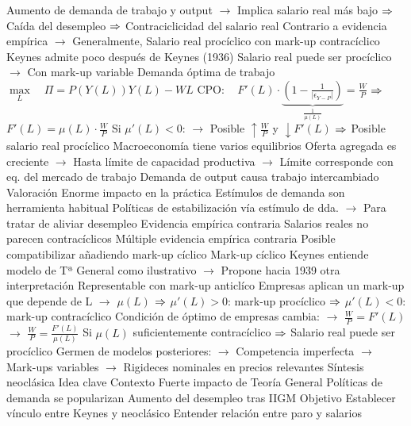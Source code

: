 \documentclass{nuevotema}
\begin{document}
\begin{esquemal}
				\4[] Aumento de demanda de trabajo y output
				\4[] $\to$ Implica salario real más bajo
				\4[] $\then$ Caída del desempleo
				\4[] $\then$ Contraciclicidad del salario real
				\4[] Contrario a evidencia empírica
				\4[] $\to$ Generalmente,
				\4 Salario real procíclico con mark-up contracíclico
				\4[] Keynes admite poco después de Keynes (1936)
				\4[] Salario real puede ser procíclico
				\4[] $\to$ Con mark-up variable
				\4[] Demanda óptima de trabajo
				\4[] $\underset{L}{\max} \quad \Pi = P(Y(L))Y(L) -WL$
				\4[] $\text{CPO}: \quad F'(L) \cdot \underbrace{\left( 1 - \frac{1}{\left| \epsilon_{Y-P} \right|}\right)}_{\frac{1}{\mu(L)}} = \frac{W}{P}$
				\4[] $\then$ $F'(L) = \mu(L) \cdot \frac{W}{P}$
				\4[] Si $\mu'(L) < 0$:
				\4[] $\to$ Posible $\uparrow \frac{W}{P}$ y $\downarrow F'(L)$
				\4[] $\then$ Posible salario real procíclico
				\4 Macroeconomía tiene varios equilibrios
				\4[] Oferta agregada es creciente
				\4[] $\to$ Hasta límite de capacidad productiva
				\4[] $\to$ Límite corresponde con eq. del mercado de trabajo
				\4[] 
				\4[$\then$] Demanda de output causa trabajo intercambiado
			\3 Valoración
				\4 Enorme impacto en la práctica
				\4[] Estímulos de demanda son herramienta habitual
				\4[] Políticas de estabilización vía estímulo de dda.
				\4[] $\to$ Para tratar de aliviar desempleo
				\4 Evidencia empírica contraria
				\4[] Salarios reales no parecen contracíclicos
				\4[] Múltiple evidencia empírica contraria
				\4[] Posible compatibilizar añadiendo mark-up cíclico
				\4 Mark-up cíclico
				\4[] Keynes entiende modelo de Tª General como ilustrativo
				\4[] $\to$ Propone hacia 1939 otra interpretación
				\4[] Representable con mark-up anticlíco
				\4[] Empresas aplican un mark-up que depende de L
				\4[] $\to$ $\mu(L)$
				\4[] $\then$ $\mu'(L) > 0$: mark-up procíclico
				\4[] $\then$ $\mu'(L) < 0$: mark-up contracíclico
				\4[] Condición de óptimo de empresas cambia:
				\4[] $\to$ $\frac{W}{P} = F'(L)$ $\to$ $\frac{W}{P} = \frac{F'(L)}{\mu(L)}$
				\4[] Si $\mu(L)$ suficientemente contracíclico
				\4[] $\then$ Salario real puede ser procíclico
				\4[] Germen de modelos posteriores:
				\4[] $\to$ Competencia imperfecta
				\4[] $\to$ Mark-ups variables
				\4[] $\to$ Rigideces nominales en precios relevantes
		\2 Síntesis neoclásica
			\3 Idea clave
				\4 Contexto
				\4[] Fuerte impacto de Teoría General
				\4[] Políticas de demanda se popularizan
				\4[] Aumento del desempleo tras IIGM
				\4 Objetivo
				\4[] Establecer vínculo entre Keynes y neoclásico
				\4[] Entender relación entre paro y salarios

\end{esquemal}
\end{document}
